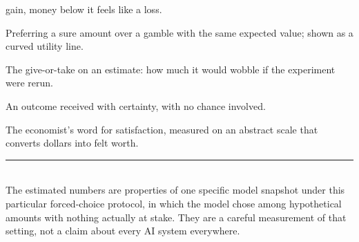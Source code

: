 \documentclass[11pt]{article}
\begin{document}
\begin{description}[leftmargin=0pt, itemsep=4pt, font=\normalfont\bfseries\color{mossdk}]
gain, money below it feels like a loss.
\item[Risk aversion] Preferring a sure amount over a gamble with the same expected value; shown as a
curved utility line.
\item[Standard error] The give-or-take on an estimate: how much it would wobble if the experiment were
rerun.
\item[Sure thing] An outcome received with certainty, with no chance involved.
\item[Utility] The economist's word for satisfaction, measured on an abstract scale that converts
dollars into felt worth.
\end{description}

\vspace{8pt}
{\color{rulegray}\rule{\linewidth}{0.8pt}}\\[3pt]
{\footnotesize\color{mutegray} The estimated numbers are properties of one specific model snapshot
under this particular forced-choice protocol, in which the model chose among hypothetical amounts with
nothing actually at stake. They are a careful measurement of that setting, not a claim about every AI
system everywhere.}
\end{document}

